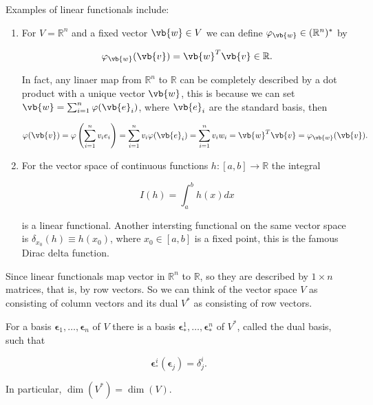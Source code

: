 \documentclass[a4paper,12pt]{report}
\begin{document}
Examples of linear functionals include:

\begin{enumerate}
    \item For \(V = \mathbb{R}^{n} \) and a fixed vector \(\vb{w} \in V\) we can define \(\varphi _{\vb{w} }\in (\mathbb{R}^{n} )^* \) by 
    
    \begin{equation}
        \varphi _{\vb{w} }(\vb{v} ) = \vb{w} ^T \vb{v} \in \mathbb{R}. 
    \end{equation}

    In fact, any linaer map from \(\mathbb{R}^{n} \) to \(\mathbb{R}\) can be completely described by a dot product with a unique vector \(\vb{w} \), this is because we can set \(\vb{w} = \sum_{i=1}^{n} \varphi (\vb{e} _{i} )\), where \(\vb{e} _{i} \) are the standard basis, then 
    
    \begin{equation}
        \varphi (\vb{v} ) = \varphi \left( \sum_{i=1}^{n} v_{i} e_{i}  \right) = \sum_{i=1}^{n} v_{i} \varphi (\vb{e} _{i} ) = \sum_{i=1}^{n} v_{i} w_{i} = \vb{w} ^T\vb{v} = \varphi _{\vb{w} }(\vb{v} ).  
    \end{equation}

    \item For the vector space of continuous functions \(h:[a,b] \to \mathbb{R}\) the integral 
    
    \begin{equation}
        I(h) = \int_{a}^{b} h(x)dx 
    \end{equation}

    is a linear functional. Another intersting functional on the same vector space is \(\delta _{x_0 }(h) \equiv h(x_0 ) \), where \(x_0 \in [a,b]\) is a fixed point, this is the famous Dirac delta function.  
\end{enumerate}

Since linear functionals map vector in \(\mathbb{R}^{n} \) to \(\mathbb{R}\), so they are described by \(1 \times n\) matrices, that is, by row vectors. So we can think of the vector space \(V\) as consisting of column vectors and its dual \(V^*\) as consisting of row vectors. 

\begin{theorem}
    For a basis \(\boldsymbol{\epsilon }_{1} , \ldots , \boldsymbol{\epsilon  }_{n}   \) of \(V\) there is a basis \(\boldsymbol{\epsilon }_{*}^{1}  , \ldots , \boldsymbol{\epsilon }_{*}^{n}    \) of \(V^*\), called the dual basis, such that 
    
    \begin{equation}
        \boldsymbol{\epsilon }_{^*}^{i}  (\boldsymbol{\epsilon }_{j} ) = \delta ^{i} _{j} .  
    \end{equation}

    In particular, \(\dim (V^*) = \dim (V)\). 
\end{theorem}
\end{document}
